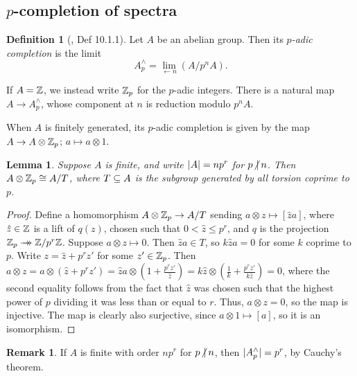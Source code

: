 \documentclass[11pt, titlepage]{article} %
\newcommand{\surj}{\rightarrow\mathrel{\mkern-14mu}\rightarrow} %
\def\subq{\ensuremath\subseteq}
\def\inte{\ensuremath\mathbb{Z}}
\def\nvert{\ensuremath\hspace{-0.5ex}\not\vert\hspace{0.5ex}}
\numberwithin{equation}{subsection}
\theoremstyle{plain}
\newtheorem{lemma}[theorem]{Lemma}
\theoremstyle{definition}
\newtheorem{definition}[theorem]{Definition}
\newtheorem{remark}[theorem]{Remark}
\begin{document}
\subsection{\(p\)-completion of spectra}\label{2504291246}

\begin{definition}[{\autocite{concise}, Def 10.1.1}]
Let \(A\) be an abelian group. Then its \textit{\(p\)-adic completion} is the limit 
\[A^\wedge_p=\lim\limits_{\leftarrow n} (A/p^nA).\]
\end{definition}

If \(A=\inte\), we instead write \(\inte_p\) for the \(p\)-adic integers. There is a natural map \(A \to A^\wedge_p\), whose component at \(n\) is reduction modulo \(p^nA\). 

When \(A\) is finitely generated, its \(p\)-adic completion is given by the map \(A \to A\otimes \inte_p\); \(a\mapsto a\otimes 1\). 

\begin{lemma}\label{2504031247}
Suppose \(A\) is finite, and write \(\lvert A\rvert=np^r\) for \(p\nvert n\). Then \(A\otimes\inte_p\cong A/T\), where \(T\subq A\) is the subgroup generated by all torsion coprime to \(p\).
\end{lemma}

\begin{proof}
Define a homomorphism \(A\otimes\inte_p\to A/T\) sending \(a\otimes z \mapsto [\hat za]\), where \(\hat z\in \inte\) is a lift of \(q(z)\), chosen such that \(0 < \hat z \leq p^{r}\), and \(q\) is the projection \(\inte_p \surj \inte/p^r\inte\). Suppose \(a\otimes z\mapsto 0\).  Then \(\hat za\in T\), so \(k\hat za=0\) for some \(k\) coprime to \(p\). Write \(z=\hat z + p^rz'\) for some \(z'\in\inte_p\). Then \(a\otimes z = a\otimes(\hat z + p^r z')=\hat za\otimes(1 + \frac{p^rz'}{\hat z})=k\hat z\otimes(\frac{1}{k}+\frac{p^rz'}{k\hat z})=0\), where the second  equality follows from the fact that \(\hat z\) was chosen such that the highest power of \(p\) dividing it was less than or equal to \(r\).%
\text{ }Thus, \(a\otimes z = 0\), so the map is injective. The map is clearly also surjective, since \(a\otimes 1 \mapsto [a]\), so it is an isomorphism. 
\end{proof}

\begin{remark}
If \(A\) is finite with order \(np^r\) for \(p\nvert n\), then \(\lvert A^\wedge_p\rvert=p^r\), by Cauchy's theorem. 
\end{remark}
\end{document}
